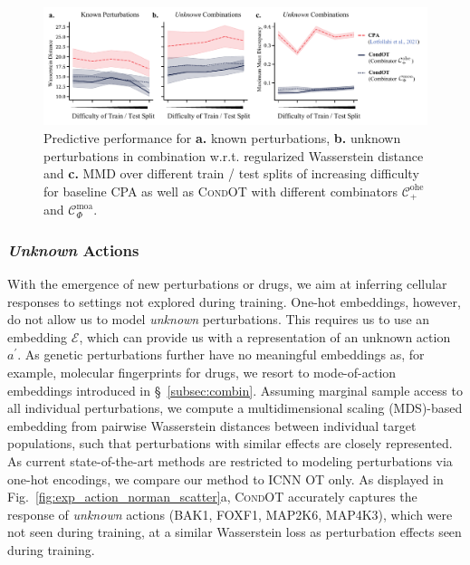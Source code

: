 \begin{figure}[t]
    \includegraphics[width=1.1\textwidth]{figures/fig_action_comb_comparison_metrics.pdf}
    \caption{Predictive performance for \textbf{a.} known perturbations, \textbf{b.} unknown perturbations in combination w.r.t. regularized Wasserstein distance and \textbf{c.} MMD over different train / test splits of increasing difficulty for baseline \textsc{CPA} as well as \textsc{CondOT} with different combinators $\mathcal{C}^\text{ohe}_+$ and $\mathcal{C}^\text{moa}_\Phi$.}
    \label{fig:exp_action_norman_line}
\end{figure}


\subsubsection{\textit{Unknown} Actions} \label{sec:eval_action_unknown}
\vspace{-5pt}

 With the emergence of new perturbations or drugs, we aim at inferring cellular responses to settings not explored during training.
One-hot embeddings, however, do not allow us to model \emph{unknown} perturbations. 
This requires us to use an embedding $\mathcal{E}$, which can provide us with a representation of an unknown action $a^\prime$.
As genetic perturbations further have no meaningful embeddings as, for example, molecular fingerprints for drugs, we resort to mode-of-action embeddings introduced in \S~\ref{subsec:combin}. Assuming marginal sample access to all individual perturbations, we compute a multidimensional scaling (MDS)-based embedding from pairwise Wasserstein distances between individual target populations, such that perturbations with similar effects are closely represented. 
As current state-of-the-art methods are restricted to modeling perturbations via one-hot encodings, we compare our method to \textsc{ICNN OT} only. As displayed in Fig.~\ref{fig:exp_action_norman_scatter}a, \textsc{CondOT} accurately captures the response of \emph{unknown} actions (BAK1, FOXF1, MAP2K6, MAP4K3), which were not seen during training, at a similar Wasserstein loss as perturbation effects seen during training.
 
